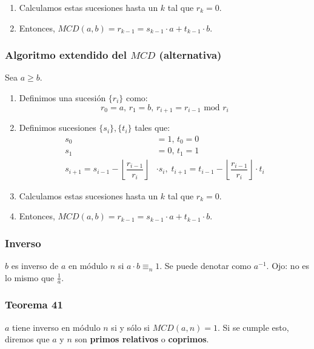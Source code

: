\begin{multicols}{2}
\begin{enumerate}
        \item Calculamos estas sucesiones hasta un $k$ tal que $r_k = 0$.
        \item Entonces, $MCD(a,b) = r_{k - 1} = s_{k - 1} \cdot a + t_{k - 1} \cdot b$.
    \end{enumerate}
    
    \subsubsection*{Algoritmo extendido del $MCD$ (alternativa)}
    Sea $a \geq b$.
    \begin{enumerate}
        \item Definimos una sucesión $\{ r_i \}$ como:
        $$
        r_0 = a, \, r_1 = b, \, r_{i + 1} = r_{i - 1} \text{ mod } r_i
        $$
        
        \item Definimos sucesiones $\{s_i\}, \{t_i\}$ tales que:
        \begin{align*}
            s_0 &= 1,\,t_0 = 0 \\
            s_1 &= 0, \, t_1 = 1 \\
            s_{i + 1} = s_{i - 1} - \left\lfloor \dfrac{r_{i-1}}{r_i} \right\rfloor &\cdot s_i,\; t_{i + 1} = t_{i - 1} - \left\lfloor \dfrac{r_{i-1}}{r_i} \right\rfloor \cdot t_i
        \end{align*}
        
        \item Calculamos estas sucesiones hasta un $k$ tal que $r_k = 0$.
        \item Entonces, $MCD(a,b) = r_{k - 1} = s_{k - 1} \cdot a + t_{k - 1} \cdot b$.
    \end{enumerate}
    
    \subsubsection*{Inverso}
    $b$ es inverso de $a$ en módulo $n$ si $a \cdot b \equiv_n 1$. Se puede denotar como $a^{-1}$. Ojo: no es lo mismo que $\frac{1}{a}$.
    
    \subsubsection*{Teorema 41}
    $a$ tiene inverso en módulo $n$ si y sólo si $MCD(a,n) = 1$. Si se cumple esto, diremos que $a$ y $n$ son \textbf{primos relativos} o \textbf{coprimos}.
    

\end{multicols}
